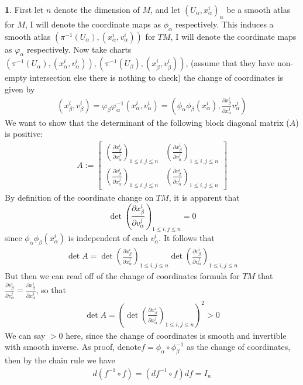 \documentclass[10.5pt]{article}
\theoremstyle{definition}
\newtheorem{pb}{}
\newcommand{\vp}{\varphi}
\begin{document}
    \begin{pb}
        First let \(n\) denote the dimension of \(M\), and let \((U_\alpha,x_\alpha^i)_\alpha\) be a smooth atlas for \(M\), I will denote the coordinate maps as \(\phi_\alpha\) respectively. This induces a smooth atlas \((\pi^{-1}(U_\alpha),(x_\alpha^i,v_\alpha^i))\) for \(TM\), I will denote the coordinate maps as \(\varphi_\alpha\) respectively. Now take charts \((\pi^{-1}(U_\alpha),(x_\alpha^i,v_\alpha^i)), (\pi^{-1}(U_\beta),(x_\beta^i,v_\beta^i))\), (assume that they have non-empty intersection else there is nothing to check) the change of coordinates is given by
        \begin{align*}
            (x_\beta^i,v_\beta^i) = \vp_\beta \vp_\alpha^{-1}(x_\alpha^i,v_\alpha^i) = (\phi_\alpha \phi_\beta(x_\alpha^i), \frac{\partial x_\beta^i}{\partial x_\alpha^j} v_\alpha^j)
        \end{align*}
        We want to show that the determinant of the following block diagonal matrix (\(A\)) is positive:
        \begin{align*}
            A := \begin{bmatrix} 
                \left(\frac{\partial x_\beta^i}{\partial x_\alpha^j} \right)_{1 \leq i,j \leq n} &
                \left(\frac{\partial x_\beta^i}{\partial v_\alpha^j} \right)_{1 \leq i,j \leq n} \\
                \left(\frac{\partial v_\beta^i}{\partial x_\alpha^j} \right)_{1 \leq i,j \leq n} &
                \left(\frac{\partial v_\beta^i}{\partial v_\alpha^j} \right)_{1 \leq i,j \leq n}
            \end{bmatrix}
        \end{align*}
        By definition of the coordinate change on \(TM\), it is apparent that
        \[\det \left(\frac{\partial x_\beta^i}{\partial v_\alpha^j} \right)_{1 \leq i,j \leq n} = 0\]
        since \(\phi_\alpha \phi_\beta(x_\alpha^i)\) is independent of each \(v_\alpha^i\).
        It follows that
        \begin{align*}
            \det A = \det \left(\frac{\partial x_\beta^i}{\partial x_\alpha^j} \right)_{1 \leq i,j \leq n} \det \left(\frac{\partial v_\beta^i}{\partial v_\alpha^j} \right)_{1 \leq i,j \leq n}
        \end{align*}
        But then we can read off of the change of coordinates formula for \(TM\) that
        \(\frac{\partial v_\beta^i}{\partial v_\alpha^j} = \frac{\partial x_\beta^i}{\partial x_\alpha^j}\), so that
        \begin{align*}
            \det A = \left(\det \left(\frac{\partial x_\beta^i}{\partial x_\alpha^j} \right)_{1 \leq i,j \leq n}\right)^2 > 0
        \end{align*}
        We can say \(> 0\) here, since the change of coordinates is smooth and invertible with smooth inverse. As proof, denote\(f = \phi_\alpha \circ \phi_\beta^{-1}\) as the change of coordinates, then by the chain rule we have
        \begin{align*}
            d(f^{-1}\circ f) = (df^{-1}\circ f) df = I_n
        \end{align*}
    \end{pb}
\end{document}

